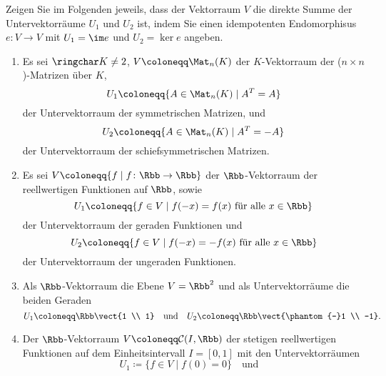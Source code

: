 \begin{question}
  Zeigen Sie im Folgenden jeweils, dass der Vektorraum $V$ die direkte Summe der Untervektorräume $U_1$ und $U_2$ ist, indem Sie einen idempotenten Endomorphisus $e \colon V \to V$ mit $U_1 = \im e$ und $U_2 = \ker e$ angeben.
  \begin{enumerate}[leftmargin=*]
    \item
      Es sei $\ringchar K \neq 2$, $V \coloneqq \Mat_n(K)$ der $K$-Vektorraum der ($n \times n$)-Matrizen über $K$,
      \[
        U_1 \coloneqq \{ A \in \Mat_n(K) \mid A^T = A \}
      \]
      der Untervektorraum der symmetrischen Matrizen, und
      \[
        U_2 \coloneqq \{ A \in \Mat_n(K) \mid A^T = -A \}
      \]
      der Untervektorraum der schiefsymmetrischen Matrizen.
    \item
      Es sei $V \coloneqq \{ f \mid f \colon \Rbb \to \Rbb \}$ der $\Rbb$-Vektorraum der reellwertigen Funktionen auf $\Rbb$, sowie
      \[
        U_1 \coloneqq \{ f \in V \mid \text{$f(-x) = f(x)$ für alle $x \in \Rbb$} \}
      \]
      der Untervektorraum der geraden Funktionen und
      \[
        U_2 \coloneqq \{ f \in V \mid \text{$f(-x) = -f(x)$ für alle $x \in \Rbb$} \}
      \]
      der Untervektorraum der ungeraden Funktionen.
    \item
      Als $\Rbb$-Vektorraum die Ebene $V = \Rbb^2$ und als Untervektorräume die beiden Geraden
      \[
        U_1 \coloneqq \Rbb \vect{1 \\  1}
        \quad\text{und}\quad
        U_2 \coloneqq \Rbb \vect{\phantom{-}1 \\ -1}.
      \]
    \item
      Der $\Rbb$-Vektorraum $V \coloneqq \mathcal{C}(I, \Rbb)$ der stetigen reellwertigen Funktionen auf dem Einheitsintervall $I = [0,1]$ mit den Untervektorräumen
      \[
        U_1 \coloneqq \{f \in V \mid f(0) = 0\}
        \quad\text{und}\quad
\]
\end{enumerate}
\end{question}
